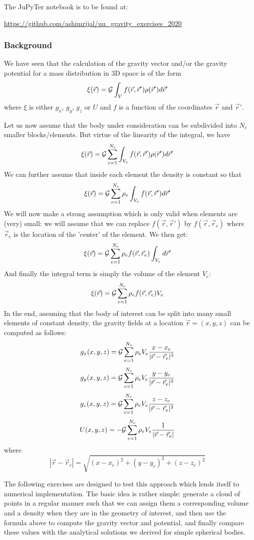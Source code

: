 

The JuPyTer notebook is to be found at:

\url{https://github.com/ashimrijal/uu_gravity_exercises_2020}


\subsubsection{Background}

We have seen that the calculation of the gravity vector and/or the gravity potential 
for a mass distribution in 3D space is of the form 
\[
\xi(\vec{r})= {\cal G}  \int_V f(\vec{r},\vec{r}') \rho(\vec{r}') d\vec{r}'
\]
where $\xi$ is either $g_x$, $g_y$, $g_z$ or $U$ and $f$ is a function of the coordinates $\vec{r}$
and $\vec{r}'$.

Let us now assume that the body under consideration can be subdivided into $N_e$ smaller blocks/elements.
But virtue of the linearity of the integral, we have
\[
\xi(\vec{r})={\cal G} \sum_{e=1}^{N_e} \int_{V_e} f(\vec{r},\vec{r}') \rho(\vec{r}') d\vec{r}'
\]
We can further assume that inside each element the density is constant so that 
\[
\xi(\vec{r})={\cal G} \sum_{e=1}^{N_e} \rho_e \int_{V_e} f(\vec{r},\vec{r}') d\vec{r}'
\]
We will now make a strong assumption which is only valid when elements are (very) small:
we will assume that we can replace $f(\vec{r},\vec{r}')$ by $f(\vec{r},\vec{r}_e)$
where $\vec{r}_e$ is the location of the 'center' of the element. We then get:
\[
\xi(\vec{r})= {\cal G}\sum_{e=1}^{N_e} \rho_e  f(\vec{r},\vec{r}_e) \int_{V_e}d\vec{r}'
\]
And finally the integral term is simply the volume of the element $V_e$:
\[
\xi(\vec{r})= {\cal G} \sum_{e=1}^{N_e} \rho_e  f(\vec{r},\vec{r}_e) V_e
\]
In the end, assuming that the body of interest can be split into many small 
elements of constant density, the gravity fields at a location $\vec{r}=(x,y,z)$
can be computed as follows:
\[
g_x(x,y,z) = {\cal G} \sum_{e=1}^{N_e} \rho_e V_e  \frac{x-x_e}{|\vec{r}-\vec{r}_e|^3}
\]
\[
g_y(x,y,z) = {\cal G} \sum_{e=1}^{N_e} \rho_e V_e  \frac{y-y_e}{|\vec{r}-\vec{r}_e|^3}
\]
\[
g_z(x,y,z) = {\cal G} \sum_{e=1}^{N_e} \rho_e V_e  \frac{z-z_e}{|\vec{r}-\vec{r}_e|^3}
\]
\[
U(x,y,z) = -{\cal G} \sum_{e=1}^{N_e} \rho_e V_e  \frac{1}{|\vec{r}-\vec{r}_e|}
\]
where 
\[
|\vec{r}-\vec{r}_e|=\sqrt{ (x-x_e)^2+(y-y_e)^2+(z-z_e)^2   }
\]

The following exercises are designed to test this approach which lends itself to 
numerical implementation. 
The basic idea is rather simple: generate a cloud of points in a regular manner such that 
we can assign them a corresponding volume and a density when they are in the geometry of interest, 
and then use the formula above to compute the gravity vector and potential, and finally 
compare these values with the analytical solutions we derived for simple spherical bodies. 


